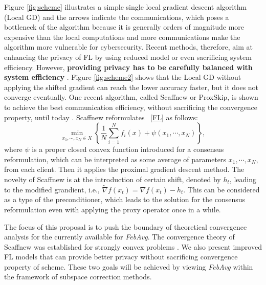 \begin{itemize}
Figure \ref{fig:scheme} illustrates a simple single local gradient descent algorithm (Local GD) and the arrows indicate the communications, which poses a bottleneck of the algorithm because it is generally orders of magnitude more expensive than the local computations and more communications make the algorithm more vulnerable for cybersecurity. Recent methods, therefore, aim at enhancing the privacy of FL by using reduced model or even sacrificing system efficiency. However, {\textbf{providing privacy has to be carefully balanced with system efficiency}} \cite{li2020federated}. Figure \ref{fig:scheme2} shows that the Local GD without applying the shifted gradient can reach the lower accuracy faster, but it does not converge eventually. One recent algorithm, called Scaffnew or ProxSkip, is shown to achieve the best communication efficiency, without sacrificing the convergence property, until today \cite{mishchenko2022proxskip}. Scaffnew reformulates ~\cref{FL} as follows:
\begin{equation}\label{cp}
\min_{x_1, \cdots, x_N \in X} \left \{ \frac{1}{N} \sum_{i=1}^N f_i(x) + \psi(x_1,\cdots,x_N) \right \},
\end{equation} 
where $\psi$ is a proper closed convex function introduced for a consensus reformulation, which can be interpreted as some average of parameters $x_1,\cdots,x_N$, from each client. Then it applies the proximal gradient descent method. The novelty of Scaffnew is at the introduction of certain shift, denoted by $h_t$, leading to the modified grandient, i.e., $\widetilde{\nabla}f(x_t) = \nabla f(x_t) - h_t$. This can be considered as a type of the preconditioner, which leads to the solution for the consensus reformulation even with applying the proxy operator once in a while. 


The focus of this proposal is to push the boundary of theoretical convergence analysis for the currently available for {\textit{FebAvg}}. The convergence theory of Scaffnew was established for strongly convex problems \cite{mishchenko2022proxskip}. We also present improved FL models that can provide better privacy without sacrificing convergence property of scheme. These two goals will be achieved by viewing \textit{FebAvg} within the framework of subspace correction methods.  


\end{itemize}
